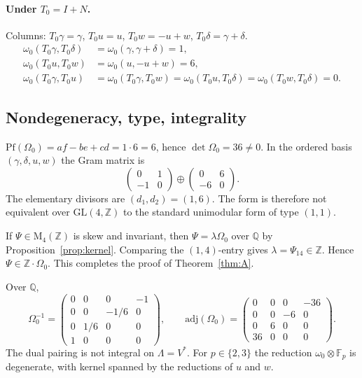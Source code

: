 \documentclass[11pt,a4paper]{article}
\theoremstyle{definition}
\theoremstyle{remark}
\newcommand{\Q}{\mathbb{Q}}
\newcommand{\Z}{\mathbb{Z}}
\newcommand{\Pf}{\mathrm{Pf}}
\begin{document}
\paragraph{Under $T_0=I+N$.}
Columns: $T_0\gamma=\gamma$, $T_0u=u$, $T_0w=-u+w$, $T_0\delta=\gamma+\delta$.
\begin{align*}
\omega_0(T_0\gamma,T_0\delta)&=\omega_0(\gamma,\gamma+\delta)=1,\\
\omega_0(T_0u,T_0w)&=\omega_0(u,-u+w)=6,\\
\omega_0(T_0\gamma,T_0u)&=\omega_0(T_0\gamma,T_0w)=\omega_0(T_0u,T_0\delta)=\omega_0(T_0w,T_0\delta)=0.
\end{align*}

\subsection{Nondegeneracy, type, integrality}

$\Pf(\Omega_0)=af-be+cd=1\cdot 6=6$, hence $\det\Omega_0=36\neq 0$. In the ordered basis $(\gamma,\delta,u,w)$ the Gram matrix is
\[
\begin{pmatrix}0&1\\-1&0\end{pmatrix}\oplus\begin{pmatrix}0&6\\-6&0\end{pmatrix}.
\]
The elementary divisors are $(d_1,d_2)=(1,6)$. The form is therefore not equivalent over $\mathrm{GL}(4,\Z)$ to the standard unimodular form of type $(1,1)$.

If $\Psi\in\mathrm{M}_4(\Z)$ is skew and invariant, then $\Psi=\lambda\Omega_0$ over $\Q$ by Proposition~\ref{prop:kernel}. Comparing the $(1,4)$-entry gives $\lambda=\Psi_{14}\in\Z$. Hence $\Psi\in\Z\cdot\Omega_0$. This completes the proof of Theorem~\ref{thm:A}.

Over $\Q$,
\[
\Omega_0^{-1}=\begin{pmatrix}0&0&0&-1\\0&0&-1/6&0\\0&1/6&0&0\\1&0&0&0\end{pmatrix},\qquad
\mathrm{adj}(\Omega_0)=\begin{pmatrix}0&0&0&-36\\0&0&-6&0\\0&6&0&0\\36&0&0&0\end{pmatrix}.
\]
The dual pairing is not integral on $\Lambda=V^*$. For $p\in\{2,3\}$ the reduction $\omega_0\otimes\mathbb{F}_p$ is degenerate, with kernel spanned by the reductions of $u$ and $w$.
\end{document}
